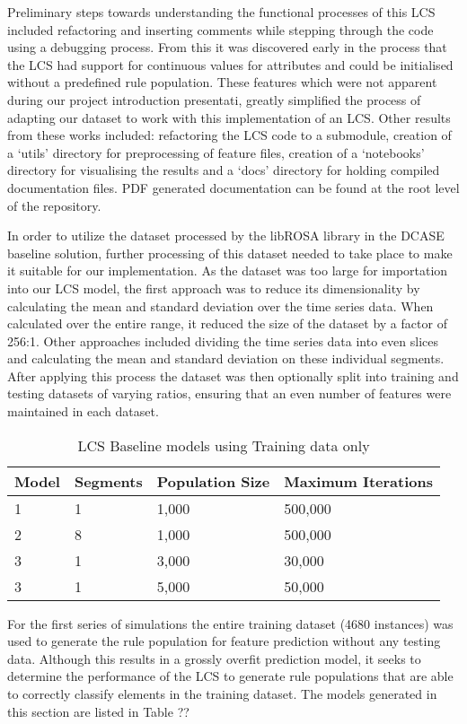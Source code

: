 \documentclass[11pt]{article}
\begin{document}
\begin{multicols}{2}
Preliminary steps towards understanding the functional processes of this LCS included refactoring and inserting comments while stepping through the code using a debugging process. From this it was discovered early in the process that the LCS had support for continuous values for attributes and could be initialised without a predefined rule population. These features which were not apparent during our project introduction presentati, greatly simplified the process of adapting our dataset to work with this implementation of an LCS. Other results from these works included: refactoring the LCS code to a submodule, creation of a ‘utils’ directory for preprocessing of feature files, creation of a ‘notebooks’ directory for visualising the results and a ‘docs’ directory for holding compiled documentation files. PDF generated documentation can be found at the root level of the repository.

In order to utilize the dataset processed by the libROSA library in the DCASE baseline solution, further processing of this dataset needed to take place to make it suitable for our implementation. As the dataset was too large for importation into our LCS model, the first approach was to reduce its dimensionality by calculating the mean and standard deviation over the time series data. When calculated over the entire range, it reduced the size of the dataset by a factor of 256:1. Other approaches included dividing the time series data into even slices and calculating the mean and standard deviation on these individual segments. After applying this process the dataset was then optionally split into training and testing datasets of varying ratios, ensuring that an even number of features were maintained in each dataset.

\begin{table}
	\caption{LCS Baseline models using Training data only}
	\label{lcs-bs-models-tr}
	\begin{tabular}{|l|l|l|l|}
		\hline
		Model & Segments & Population Size & Maximum Iterations \\ \hline
		1 & 1 & 1,000 & 500,000 \\
		2 & 8 & 1,000 & 500,000 \\
		3 & 1 & 3,000 & 30,000 \\
		3 & 1 & 5,000 & 50,000 \\
		\hline
	\end{tabular}
\end{table}

For the first series of simulations the entire training dataset (4680 instances) was used to generate the rule population for feature prediction without any testing data. Although this results in a grossly overfit prediction model, it seeks to determine the performance of the LCS to generate rule populations that are able to correctly classify elements in the training dataset. The models generated in this section are listed in Table ??


\end{multicols}
\end{document}
